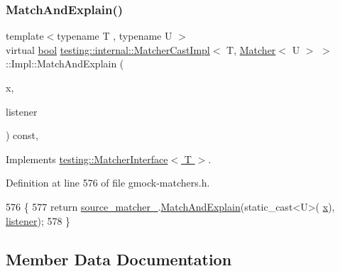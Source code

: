 \subsubsection{\texorpdfstring{Match\+And\+Explain()}{MatchAndExplain()}}
{\footnotesize\ttfamily template$<$typename T , typename U $>$ \\
virtual \hyperlink{classbool}{bool} \hyperlink{classtesting_1_1internal_1_1MatcherCastImpl}{testing\+::internal\+::\+Matcher\+Cast\+Impl}$<$ T, \hyperlink{classtesting_1_1Matcher}{Matcher}$<$ U $>$ $>$\+::Impl\+::\+Match\+And\+Explain (\begin{DoxyParamCaption}\item[{T}]{x,  }\item[{\hyperlink{classtesting_1_1MatchResultListener}{Match\+Result\+Listener} $\ast$}]{listener }\end{DoxyParamCaption}) const\hspace{0.3cm}{\ttfamily [inline]}, {\ttfamily [virtual]}}



Implements \hyperlink{classtesting_1_1MatcherInterface_a296b43607cd99d60365f0e6a762777cf}{testing\+::\+Matcher\+Interface$<$ T $>$}.



Definition at line 576 of file gmock-\/matchers.\+h.


\begin{DoxyCode}
576                                                                            \{
577       \textcolor{keywordflow}{return} \hyperlink{classtesting_1_1internal_1_1MatcherCastImpl_3_01T_00_01Matcher_3_01U_01_4_01_4_1_1Impl_a812216395addd6e4bcfe54317ae42236}{source\_matcher\_}.\hyperlink{classtesting_1_1internal_1_1MatcherBase_a08429a6d7e7d330de4a4eb4e272105a7}{MatchAndExplain}(static\_cast<U>(
      \hyperlink{namespaceinteractive__marker_acda52804aef30b460a72fb21ee01d69d}{x}), \hyperlink{namespaceinteractive__marker_a0e579ab555212bb5e2c9f8a675b7618a}{listener});
578     \}
\end{DoxyCode}


\subsection{Member Data Documentation}
\mbox{\label{classtesting_1_1internal_1_1MatcherCastImpl_3_01T_00_01Matcher_3_01U_01_4_01_4_1_1Impl_a812216395addd6e4bcfe54317ae42236}} 
